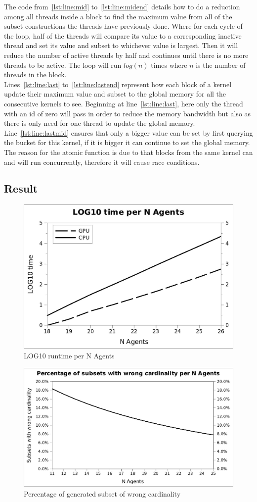\documentclass[a4paper, 12pt]{report}
\begin{document}
The code from~\ref{lst:line:mid} to~\ref{lst:line:midend} details how to do a reduction among all threads inside a block to find the maximum value from all of the subset constructions the threads have previously done. Where for each cycle of the loop, half of the threads will compare its value to a corresponding inactive thread and set its value and subset to whichever value is largest. Then it will reduce the number of active threads by half and continues until there is no more threads to be active. The loop will run $log(n)$ times where $n$ is the number of threads in the block.\\

Lines~\ref{lst:line:last} to~\ref{lst:line:lastend} represent how each block of a kernel update their maximum value and subset to the global memory for all the consecutive kernels to see. Beginning at line~\ref{lst:line:last}, here only the thread with an id of zero will pass in order to reduce the memory bandwidth but also as there is only need for one thread to update the global memory. Line~\ref{lst:line:lastmid} ensures that only a bigger value can be set by first querying the bucket for this kernel, if it is bigger it can continue to set the global memory. The reason for the atomic function is due to that blocks from the same kernel can and will run concurrently, therefore it will cause race conditions.
\newpage
\subsection{Result}
\begin{figure}[htb]
\centering
\includegraphics[width=0.7\linewidth]{loggraph.jpg}
\caption{LOG10 runtime per N Agents\label{log}}
\end{figure}
\begin{figure}[htb]
\centering
\includegraphics[width=0.7\linewidth]{subset.jpg}
\caption{Percentage of generated subset of wrong cardinality\label{overhead}}
\end{figure}
\end{document}
